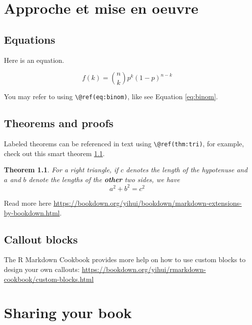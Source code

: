 \documentclass[
]{book}
\newtheorem{theorem}{Theorem}[chapter]
\theoremstyle{definition}
\theoremstyle{definition}
\theoremstyle{definition}
\theoremstyle{definition}
\theoremstyle{remark}
\begin{document}
\hypertarget{approche-et-mise-en-oeuvre}{%
\chapter{Approche et mise en oeuvre}\label{approche-et-mise-en-oeuvre}}

\hypertarget{equations}{%
\section{Equations}\label{equations}}

Here is an equation.

\begin{equation} 
  f\left(k\right) = \binom{n}{k} p^k\left(1-p\right)^{n-k}
  \label{eq:binom}
\end{equation}

You may refer to using \texttt{\textbackslash{}@ref(eq:binom)}, like see Equation \eqref{eq:binom}.

\hypertarget{theorems-and-proofs}{%
\section{Theorems and proofs}\label{theorems-and-proofs}}

Labeled theorems can be referenced in text using \texttt{\textbackslash{}@ref(thm:tri)}, for example, check out this smart theorem \ref{thm:tri}.

\begin{theorem}
\protect\hypertarget{thm:tri}{}\label{thm:tri}For a right triangle, if \(c\) denotes the \emph{length} of the hypotenuse
and \(a\) and \(b\) denote the lengths of the \textbf{other} two sides, we have
\[a^2 + b^2 = c^2\]
\end{theorem}

Read more here \url{https://bookdown.org/yihui/bookdown/markdown-extensions-by-bookdown.html}.

\hypertarget{callout-blocks}{%
\section{Callout blocks}\label{callout-blocks}}

The R Markdown Cookbook provides more help on how to use custom blocks to design your own callouts: \url{https://bookdown.org/yihui/rmarkdown-cookbook/custom-blocks.html}

\hypertarget{sharing-your-book}{%
\chapter{Sharing your book}\label{sharing-your-book}}
\end{document}
